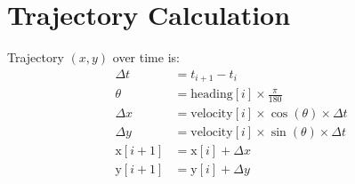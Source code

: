 \documentclass{article}
\begin{document}
\section*{Trajectory Calculation}
Trajectory $(x, y)$ over time is:
\begin{align*}
\Delta t &= t_{i+1} - t_i \\
\theta &= \text{heading}[i] \times \frac{\pi}{180} \\
\Delta x &= \text{velocity}[i] \times \cos(\theta) \times \Delta t \\
\Delta y &= \text{velocity}[i] \times \sin(\theta) \times \Delta t \\
\text{x}[i+1] &= \text{x}[i] + \Delta x \\
\text{y}[i+1] &= \text{y}[i] + \Delta y
\end{align*}
\end{document}

